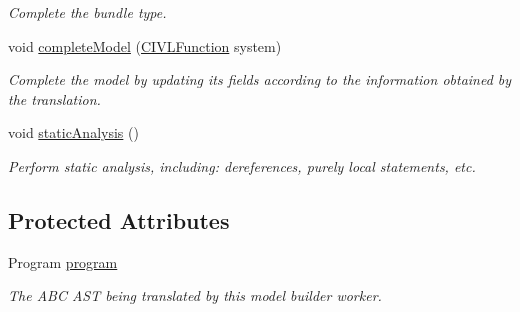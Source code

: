 \begin{DoxyCompactItemize}
\begin{DoxyCompactList}\small\item\em Complete the bundle type. \end{DoxyCompactList}\item 
void \hyperlink{classedu_1_1udel_1_1cis_1_1vsl_1_1civl_1_1model_1_1common_1_1ModelBuilderWorker_a152801a1e56aefe0d11bd890831e25dd}{complete\+Model} (\hyperlink{interfaceedu_1_1udel_1_1cis_1_1vsl_1_1civl_1_1model_1_1IF_1_1CIVLFunction}{C\+I\+V\+L\+Function} system)
\begin{DoxyCompactList}\small\item\em Complete the model by updating its fields according to the information obtained by the translation. \end{DoxyCompactList}\item 
\hypertarget{classedu_1_1udel_1_1cis_1_1vsl_1_1civl_1_1model_1_1common_1_1ModelBuilderWorker_ae6f1fd7f353adf0182ee72a59e8cb4f3}{}void \hyperlink{classedu_1_1udel_1_1cis_1_1vsl_1_1civl_1_1model_1_1common_1_1ModelBuilderWorker_ae6f1fd7f353adf0182ee72a59e8cb4f3}{static\+Analysis} ()\label{classedu_1_1udel_1_1cis_1_1vsl_1_1civl_1_1model_1_1common_1_1ModelBuilderWorker_ae6f1fd7f353adf0182ee72a59e8cb4f3}

\begin{DoxyCompactList}\small\item\em Perform static analysis, including\+: dereferences, purely local statements, etc. \end{DoxyCompactList}\end{DoxyCompactItemize}
\subsection*{Protected Attributes}
\begin{DoxyCompactItemize}
\item 
\hypertarget{classedu_1_1udel_1_1cis_1_1vsl_1_1civl_1_1model_1_1common_1_1ModelBuilderWorker_a7e3f8abb32b52ac4db3230cd4c54d9dd}{}Program \hyperlink{classedu_1_1udel_1_1cis_1_1vsl_1_1civl_1_1model_1_1common_1_1ModelBuilderWorker_a7e3f8abb32b52ac4db3230cd4c54d9dd}{program}\label{classedu_1_1udel_1_1cis_1_1vsl_1_1civl_1_1model_1_1common_1_1ModelBuilderWorker_a7e3f8abb32b52ac4db3230cd4c54d9dd}

\begin{DoxyCompactList}\small\item\em The A\+B\+C A\+S\+T being translated by this model builder worker. \end{DoxyCompactList}\end{DoxyCompactItemize}


